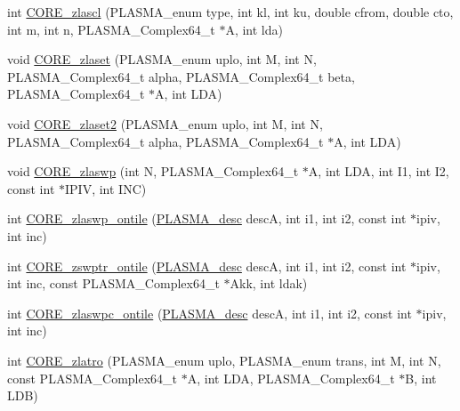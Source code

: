 \begin{DoxyCompactItemize}
\item 
int \hyperlink{group__CORE__PLASMA__Complex64__t_gaf9bd6c0e15676809ba4e7b79007d9704_gaf9bd6c0e15676809ba4e7b79007d9704}{C\+O\+R\+E\+\_\+zlascl} (P\+L\+A\+S\+M\+A\+\_\+enum type, int kl, int ku, double cfrom, double cto, int m, int n, P\+L\+A\+S\+M\+A\+\_\+\+Complex64\+\_\+t $\ast$A, int lda)
\item 
void \hyperlink{group__CORE__PLASMA__Complex64__t_ga4520d880257cb8fb54214b141f82f50d_ga4520d880257cb8fb54214b141f82f50d}{C\+O\+R\+E\+\_\+zlaset} (P\+L\+A\+S\+M\+A\+\_\+enum uplo, int M, int N, P\+L\+A\+S\+M\+A\+\_\+\+Complex64\+\_\+t alpha, P\+L\+A\+S\+M\+A\+\_\+\+Complex64\+\_\+t beta, P\+L\+A\+S\+M\+A\+\_\+\+Complex64\+\_\+t $\ast$A, int L\+D\+A)
\item 
void \hyperlink{group__CORE__PLASMA__Complex64__t_ga9cc98c3397de94135cf5f90a9b5f9079_ga9cc98c3397de94135cf5f90a9b5f9079}{C\+O\+R\+E\+\_\+zlaset2} (P\+L\+A\+S\+M\+A\+\_\+enum uplo, int M, int N, P\+L\+A\+S\+M\+A\+\_\+\+Complex64\+\_\+t alpha, P\+L\+A\+S\+M\+A\+\_\+\+Complex64\+\_\+t $\ast$A, int L\+D\+A)
\item 
void \hyperlink{group__CORE__PLASMA__Complex64__t_ga6cc830dc037933693b8499f80c03965f_ga6cc830dc037933693b8499f80c03965f}{C\+O\+R\+E\+\_\+zlaswp} (int N, P\+L\+A\+S\+M\+A\+\_\+\+Complex64\+\_\+t $\ast$A, int L\+D\+A, int I1, int I2, const int $\ast$I\+P\+I\+V, int I\+N\+C)
\item 
int \hyperlink{group__CORE__PLASMA__Complex64__t_ga72aa3b8a44f226cdcca1f5100b88584f_ga72aa3b8a44f226cdcca1f5100b88584f}{C\+O\+R\+E\+\_\+zlaswp\+\_\+ontile} (\hyperlink{structplasma__desc__t}{P\+L\+A\+S\+M\+A\+\_\+desc} desc\+A, int i1, int i2, const int $\ast$ipiv, int inc)
\item 
int \hyperlink{group__CORE__PLASMA__Complex64__t_ga2d2f86545b9bbb4cb9a179ff600192b4_ga2d2f86545b9bbb4cb9a179ff600192b4}{C\+O\+R\+E\+\_\+zswptr\+\_\+ontile} (\hyperlink{structplasma__desc__t}{P\+L\+A\+S\+M\+A\+\_\+desc} desc\+A, int i1, int i2, const int $\ast$ipiv, int inc, const P\+L\+A\+S\+M\+A\+\_\+\+Complex64\+\_\+t $\ast$Akk, int ldak)
\item 
int \hyperlink{group__CORE__PLASMA__Complex64__t_gabffb9752770ff6bd657cfdd247a4e49b_gabffb9752770ff6bd657cfdd247a4e49b}{C\+O\+R\+E\+\_\+zlaswpc\+\_\+ontile} (\hyperlink{structplasma__desc__t}{P\+L\+A\+S\+M\+A\+\_\+desc} desc\+A, int i1, int i2, const int $\ast$ipiv, int inc)
\item 
int \hyperlink{group__CORE__PLASMA__Complex64__t_ga253765637c7292f4f00a1d1becfa63cd_ga253765637c7292f4f00a1d1becfa63cd}{C\+O\+R\+E\+\_\+zlatro} (P\+L\+A\+S\+M\+A\+\_\+enum uplo, P\+L\+A\+S\+M\+A\+\_\+enum trans, int M, int N, const P\+L\+A\+S\+M\+A\+\_\+\+Complex64\+\_\+t $\ast$A, int L\+D\+A, P\+L\+A\+S\+M\+A\+\_\+\+Complex64\+\_\+t $\ast$B, int L\+D\+B)

\end{DoxyCompactItemize}
